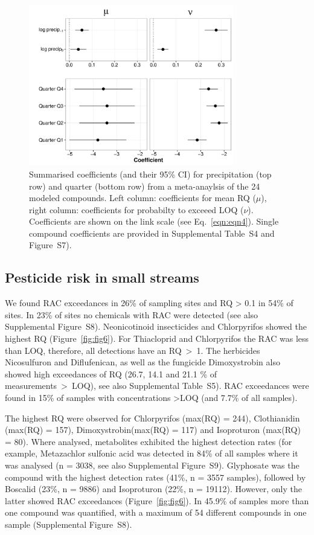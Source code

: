 \documentclass[journal=esthag,manuscript=article]{achemso}
\begin{document}
\begin{figure}[ht]
  \includegraphics[width=0.8\textwidth]{figure5.pdf}
  \caption{Summarised coefficients (and their 95\% CI) for precipitation (top row) and quarter (bottom row) from a meta-anaylsis of the 24 modeled compounds. Left column: coefficients for mean RQ ($\mu$), right column: coefficients for probabilty to exceeed LOQ ($\nu$). 
  Coefficients are shown on the link scale (see Eq.~\ref{eqn:eqn4}).
  Single compound coefficients are provided in Supplemental Table~S4 and Figure~S7).
  }
  \label{fig:fig5}
\end{figure}



\subsection{Pesticide risk in small streams}
We found RAC exceedances in 26\% of sampling sites and RQ > 0.1 in 54\% of sites. 
In 23\% of sites no chemicals with RAC were detected (see also Supplemental Figure~S8).
Neonicotinoid insecticides and Chlorpyrifos showed the highest RQ (Figure~\ref{fig:fig6}). %
For Thiacloprid and Chlorpyrifos the RAC was less than LOQ, therefore, all detections have an RQ~\textgreater~1. 
The herbicides Nicosulfuron and Diflufenican, as well as the fungicide Dimoxystrobin also showed high exceedances of RQ (26.7, 14.1 and 21.1 \% of measurements~\textgreater~LOQ), see also Supplemental Table~S5).
RAC exceedances were found in 15\% of samples with concentrations \textgreater LOQ (and 7.7\% of all samples).

The highest RQ were observed for Chlorpyrifos (max(RQ) = 244), Clothianidin (max(RQ) = 157), Dimoxystrobin(max(RQ) = 117) and Isoproturon (max(RQ) = 80). 
Where analysed, metabolites exhibited the highest detection rates (for example, Metazachlor sulfonic acid was detected in 84\% of all samples where it was analysed (n = 3038, see also Supplemental Figure~S9).
Glyphosate was the compound with the highest detection rates (41\%, n = 3557 samples), followed by Boscalid (23\%, n = 9886) and Isoproturon (22\%, n = 19112). 
However, only the latter showed RAC exceedances (Figure~\ref{fig:fig6}).
In 45.9\% of samples more than one compound was quantified, with a maximum of 54 different compounds in one sample (Supplemental Figure~S8). 
\end{document}
